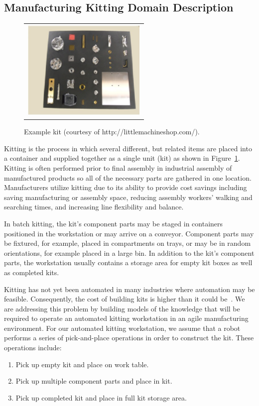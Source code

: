 \documentclass[preprint,12pt]{elsarticle}
\begin{document}
\subsection{Manufacturing Kitting Domain Description}
\begin{figure}[h!b!]
\begin{center}
\begin{tabular}{c}
\includegraphics[width=6cm]{kit.pdf}
\end{tabular}
\end{center}
\caption{Example kit (courtesy of http://littlemachineshop.com/).}
\label{fig:kit}
\end{figure}
Kitting is the process in which several different, but related items are placed into a container and supplied together as a single unit (kit) as shown in Figure~\ref{fig:kit}. Kitting is often performed prior to final assembly in industrial assembly of manufactured products so all of the necessary parts are gathered in one location. Manufacturers utilize kitting due to its ability to provide cost savings including saving manufacturing or assembly space, reducing assembly workers' walking and searching times, and increasing line flexibility and balance.


In batch kitting, the kit's component parts may be staged in containers positioned in the workstation or may arrive on a conveyor. Component parts may be fixtured, for example, placed in compartments on trays, or may be in random orientations, for example placed in a large bin. In addition to the kit's component parts, the workstation usually contains a storage area for empty kit boxes as well as completed kits.


Kitting has not yet been automated in many industries where automation may be feasible. Consequently, the cost of building kits is higher than it could be~\cite{Balakirsky.IROS.2012}. We are addressing this problem by building models of the knowledge that will be required to operate an automated kitting workstation in an agile manufacturing environment. For our automated kitting workstation, we assume that a robot performs a series of pick-and-place operations in order to construct the kit. These operations include:
\begin{enumerate}
\item Pick up empty kit and place on work table.
\item Pick up multiple component parts and place in kit.
\item Pick up completed kit and place in full kit storage area.
\end{enumerate}
\end{document}
